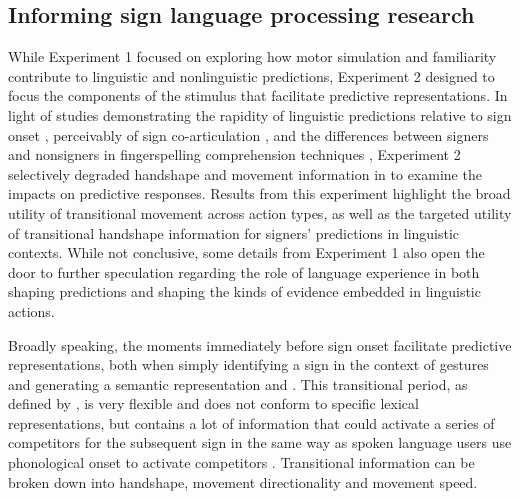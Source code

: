     \subsection{Informing sign language processing research}
        While Experiment 1 focused on exploring how motor simulation and familiarity contribute to linguistic and nonlinguistic predictions, Experiment 2 designed to focus the components of the stimulus that facilitate predictive representations. In light of studies demonstrating the rapidity of linguistic predictions relative to sign onset \cite{arendsen2007,hosemann2013}, perceivably of sign co-articulation \cite{grosvald2012}, and the differences between signers and nonsigners in fingerspelling comprehension techniques \cite{geer2017}, Experiment 2 selectively degraded handshape and movement information in to examine the impacts on predictive responses. Results from this experiment highlight the broad utility of transitional movement across action types, as well as the targeted utility of transitional handshape information for signers’ predictions in linguistic contexts. While not conclusive, some details from Experiment 1 also open the door to further speculation regarding the role of language experience in both shaping predictions and shaping the kinds of evidence embedded in linguistic actions. \par 
        Broadly speaking, the moments immediately before sign onset facilitate predictive representations, both when simply identifying a sign in the context of gestures \cite{arendsen2007} and generating a semantic representation and \cite{hosemann2013}. This transitional period, as defined by , is very flexible and does not conform to specific lexical representations, but contains a lot of information that could activate a series of competitors for the subsequent sign in the same way as spoken language users use phonological onset to activate competitors \cite{allopenna1998}. Transitional information can be broken down into handshape, movement directionality and movement speed. \par
